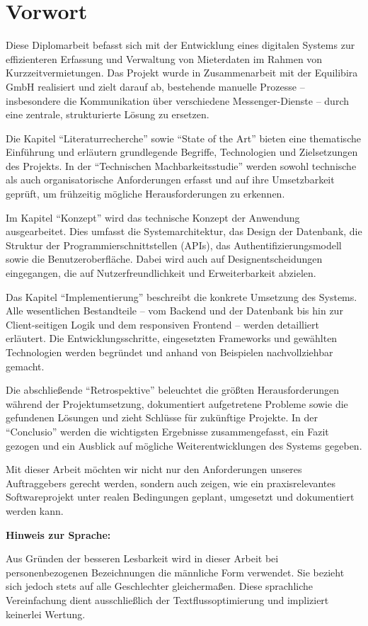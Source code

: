 \chapter{Vorwort}

Diese Diplomarbeit befasst sich mit der Entwicklung eines digitalen Systems zur effizienteren Erfassung und Verwaltung von Mieterdaten im Rahmen von Kurzzeitvermietungen. Das Projekt wurde in Zusammenarbeit mit der Equilibira GmbH realisiert und zielt darauf ab, bestehende manuelle Prozesse – insbesondere die Kommunikation über verschiedene Messenger-Dienste – durch eine zentrale, strukturierte Lösung zu ersetzen.

Die Kapitel \enquote{Literaturrecherche} sowie \enquote{State of the Art} bieten eine thematische Einführung und erläutern grundlegende Begriffe, Technologien und Zielsetzungen des Projekts. In der \enquote{Technischen Machbarkeitsstudie} werden sowohl technische als auch organisatorische Anforderungen erfasst und auf ihre Umsetzbarkeit geprüft, um frühzeitig mögliche Herausforderungen zu erkennen.

Im Kapitel \enquote{Konzept} wird das technische Konzept der Anwendung ausgearbeitet. Dies umfasst die Systemarchitektur, das Design der Datenbank, die Struktur der Programmierschnittstellen (APIs), das Authentifizierungsmodell sowie die Benutzeroberfläche. Dabei wird auch auf Designentscheidungen eingegangen, die auf Nutzerfreundlichkeit und Erweiterbarkeit abzielen.

Das Kapitel \enquote{Implementierung} beschreibt die konkrete Umsetzung des Systems. Alle wesentlichen Bestandteile – vom Backend und der Datenbank bis hin zur Client-seitigen Logik und dem responsiven Frontend – werden detailliert erläutert. Die Entwicklungsschritte, eingesetzten Frameworks und gewählten Technologien werden begründet und anhand von Beispielen nachvollziehbar gemacht.

Die abschließende \enquote{Retrospektive} beleuchtet die größten Herausforderungen während der Projektumsetzung, dokumentiert aufgetretene Probleme sowie die gefundenen Lösungen und zieht Schlüsse für zukünftige Projekte. In der \enquote{Conclusio} werden die wichtigsten Ergebnisse zusammengefasst, ein Fazit gezogen und ein Ausblick auf mögliche Weiterentwicklungen des Systems gegeben.

Mit dieser Arbeit möchten wir nicht nur den Anforderungen unseres Auftraggebers gerecht werden, sondern auch zeigen, wie ein praxisrelevantes Softwareprojekt unter realen Bedingungen geplant, umgesetzt und dokumentiert werden kann. \cite{prompt-gpt-write-vorwort}

\textbf{Hinweis zur Sprache:}

Aus Gründen der besseren Lesbarkeit wird in dieser Arbeit bei personenbezogenen Bezeichnungen die männliche Form verwendet. Sie bezieht sich jedoch stets auf alle Geschlechter gleichermaßen. Diese sprachliche Vereinfachung dient ausschließlich der Textflussoptimierung und impliziert keinerlei Wertung.